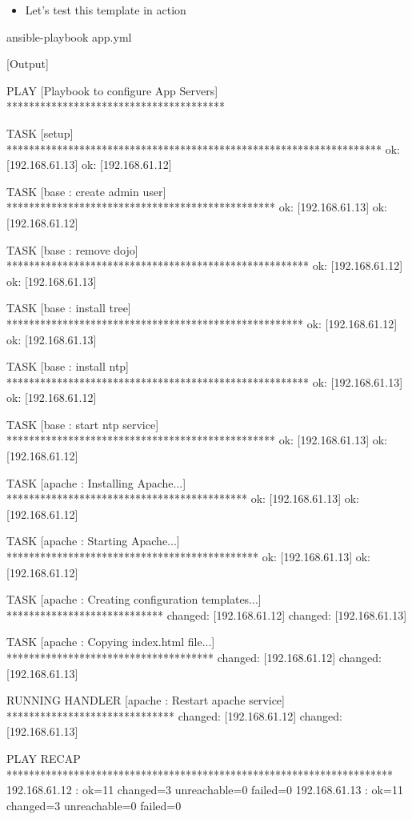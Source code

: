 \begin{itemize}
\item Let's test this template in action
\end{itemize}

\begin{code}
ansible-playbook app.yml
\end{code}

[Output]\newline
\begin{code}
PLAY [Playbook to configure App Servers] ***************************************

TASK [setup] *******************************************************************
ok: [192.168.61.13]
ok: [192.168.61.12]

TASK [base : create admin user] ************************************************
ok: [192.168.61.13]
ok: [192.168.61.12]

TASK [base : remove dojo] ******************************************************
ok: [192.168.61.12]
ok: [192.168.61.13]

TASK [base : install tree] *****************************************************
ok: [192.168.61.12]
ok: [192.168.61.13]

TASK [base : install ntp] ******************************************************
ok: [192.168.61.13]
ok: [192.168.61.12]

TASK [base : start ntp service] ************************************************
ok: [192.168.61.13]
ok: [192.168.61.12]

TASK [apache : Installing Apache...] *******************************************
ok: [192.168.61.13]
ok: [192.168.61.12]

TASK [apache : Starting Apache...] *********************************************
ok: [192.168.61.13]
ok: [192.168.61.12]

TASK [apache : Creating configuration templates...] ****************************
changed: [192.168.61.12]
changed: [192.168.61.13]

TASK [apache : Copying index.html file...] *************************************
changed: [192.168.61.12]
changed: [192.168.61.13]

RUNNING HANDLER [apache : Restart apache service] ******************************
changed: [192.168.61.12]
changed: [192.168.61.13]

PLAY RECAP *********************************************************************
192.168.61.12              : ok=11   changed=3    unreachable=0    failed=0
192.168.61.13              : ok=11   changed=3    unreachable=0    failed=0
\end{code}

